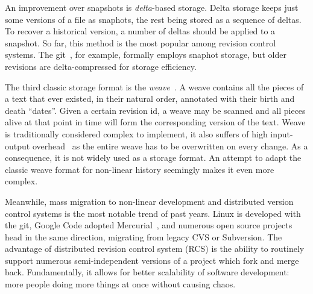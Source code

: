 \documentclass{acm_proc_article-sp}
\begin{document}
An improvement over snapshots is \emph{delta}-based storage. 
Delta storage keeps just some versions of a file as snaphots,
the rest being stored as a sequence of deltas. To recover a
historical version, a number of deltas should be applied
to a snapshot. 
So far, this method is the most popular among revision control
systems. The git~\cite{git}, for example, formally employs
snaphot storage, but older revisions are delta-compressed
for storage efficiency. 

The third classic storage format is the 
\emph{weave}~\cite{rcs-txt,revctrl-weave}. 
A weave contains all the pieces of a text that ever existed,
in their natural order, annotated with their birth and
death ``dates''. Given a certain revision id, a weave may be
scanned and all pieces alive at that point in time will form the
corresponding version of the text. Weave is traditionally
considered complex to implement, it also suffers of high 
input-output overhead~\cite{bazaar-weave} as the entire
weave has to be overwritten on every change. As a consequence, 
it is not widely used as a storage format.
An attempt to adapt the classic weave format for non-linear
history seemingly makes it even more complex.

Meanwhile, mass migration to non-linear development and distributed
version control systems is the most notable trend of past
years. Linux is developed with the git, Google Code adopted
Mercurial~\cite{mercurial}, and numerous open source projects head in the
same direction, migrating from legacy CVS or Subversion.
The advantage of distributed revision control system (RCS) is the ability
to routinely support numerous semi-independent versions
of a project which fork and merge back.
Fundamentally, it allows for better scalability of
software development: more people doing more things at
once without causing chaos.
\end{document}
